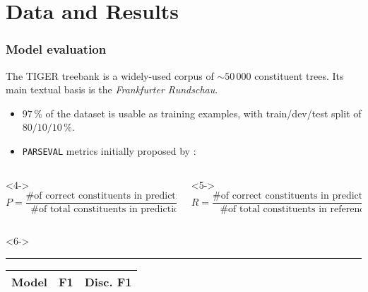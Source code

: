 \documentclass[8pt]{beamer}
\theoremstyle{definition}
\theoremstyle{plain}
\theoremstyle{definition}
\theoremstyle{remark}
\numberwithin{equation}{section}
\numberwithin{figure}{section}
\numberwithin{table}{section}
\begin{document}
\section{Data and Results}
\begin{frame}
    \frametitle{Model evaluation}
    The TIGER treebank is a widely-used corpus of \(\sim\!50\,000\) constituent trees. Its main textual basis is the \textit{Frankfurter Rundschau}.
    \begin{itemize}
        \item<2-> \(97\,\%\) of the dataset is usable as training examples, with train/dev/test split of \(80/10/10\,\%\).
        \item<3-> \texttt{PARSEVAL} metrics initially proposed by \textcite{black1991procedure}:
    \end{itemize}
    \setlength{\abovedisplayskip}{0pt}%
    \setlength{\belowdisplayskip}{0pt}%
    \setlength{\abovedisplayshortskip}{0pt}%
    \setlength{\belowdisplayshortskip}{0pt}%
    \begin{columns}[t,onlytextwidth]
        \begin{column}{0.5\textwidth}<4->
            \begin{equation*}
              P = \frac{\text{\# of correct constituents in prediction}}{\text{\# of total constituents in prediction}};  
            \end{equation*}%
        \end{column}
        \begin{column}{0.5\textwidth}<5->
            \begin{equation*}
                R = \frac{\text{\# of correct constituents in prediction}}{\text{\# of total constituents in reference}}.
            \end{equation*}%
        \end{column}
    \end{columns}%
%
    \begin{columns}[onlytextwidth]
        \begin{column}[t]{0.48\textwidth}<6->
            \hrule height 0pt
            \begin{table}
                \begin{tabular}[t]{@{}
                    >{\arraybackslash}p{(\textwidth - 6.5em)}@{}
                    >{\centering\arraybackslash}p{3em}@{}
                    >{\centering\arraybackslash}p{4em}@{}}
                    \toprule
                    \textbf{Model} & \textbf{F1} & \textbf{Disc. F1} \\ \midrule

\end{tabular}
\end{table}
\end{column}
\end{columns}
\end{frame}
\end{document}
